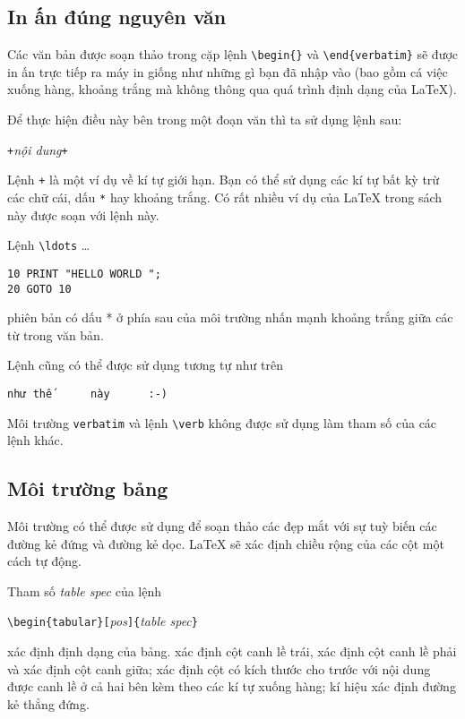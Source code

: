 \subsection{In ấn đúng nguyên văn}
Các văn bản được soạn thảo trong cặp lệnh \verb|\begin{|\verb|}| và \verb|\end{verbatim}| sẽ được in ấn trực tiếp ra máy in giống như những gì bạn đã nhập vào (bao gồm cá việc xuống hàng, khoảng trắng mà không thông qua quá
trình định dạng của \LaTeX{}).

Để thực hiện điều này bên trong một đoạn văn thì ta sử dụng lệnh sau:
\begin{lscommand}
\verb|+|\emph{nội dung}\verb|+|
\end{lscommand}
\noindent Lệnh \verb|+| là một ví dụ về kí tự giới hạn. Bạn có thể sử dụng các kí tự bất kỳ trừ các chữ cái, dấu \verb|*| hay khoảng trắng. Có rất nhiều ví dụ của \LaTeX{} trong sách này được soạn với lệnh này.
\begin{example}
Lệnh \verb|\ldots| \ldots
\begin{verbatim}
10 PRINT "HELLO WORLD ";
20 GOTO 10
\end{verbatim}
\end{example}
\begin{example}
\begin{verbatim*}
phiên bản có dấu *
ở phía sau của môi trường
 nhấn
mạnh khoảng trắng giữa
các từ trong văn bản.
\end{verbatim*}
\end{example}

Lệnh  cũng có thể được sử dụng tương tự như trên
\begin{example}
\verb*|như thế      này      :-) |
\end{example}
Môi trường \texttt{verbatim} và lệnh \verb|\verb| không được sử dụng làm tham số của các lệnh khác.

\subsection{Môi trường bảng}
\newcommand{\mfr}[1]{\framebox{\rule{0pt}{0.7em}\texttt{#1}}}
Môi trường  có thể được sử dụng để soạn thảo các  đẹp mắt với sự tuỳ biến các đường kẻ đứng và đường kẻ dọc. \LaTeX{} sẽ xác định chiều rộng của các cột một cách tự động.

Tham số \emph{table spec} của lệnh
\begin{lscommand}
\verb|\begin{tabular}[|\emph{pos}\verb|]{|\emph{table spec}\verb|}|
\end{lscommand}
\noindent xác định định dạng của bảng. \mfr{l} xác định cột canh lề trái, \mfr{r} xác định cột canh lề phải và \mfr{c} xác định cột canh giữa; \mfr{p\{\emph{độ rộng}\}} xác định cột có kích thước cho trước với nội dung được canh lề ở cả hai bên kèm theo các kí tự xuống hàng; kí hiệu \mfr{|} xác định đường kẻ thẳng đứng.

